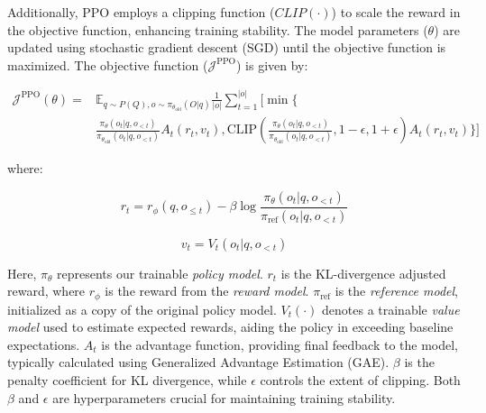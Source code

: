 Additionally, PPO employs a clipping function ($CLIP(\cdot)$) to scale the reward in the objective function, enhancing training stability. The model parameters ($\theta$) are updated using stochastic gradient descent (SGD) until the objective function is maximized. The objective function ($\mathcal{J}^{\text{PPO}}$) is given by:




\begin{footnotesize}
    \begin{equation}
        \begin{split}
            \mathcal{J}^{\text{PPO}}(\theta) =
             &\mathbb{E}_{q\sim P(Q), o\sim\pi_{\theta_{\text{old}}}(O|q)}\frac{1}{|o|}\sum_{t=1}^{|o|}\Bigg[\min\Bigg\{ \\
             &\frac{\pi_{\theta}(o_t | q, o_{<t})}{\pi_{\theta_{\text{old}}}(o_t | q, o_{<t})} A_t(r_t, v_t), \text{CLIP}\left(\frac{\pi_{\theta}(o_t | q, o_{<t})}{\pi_{\theta_{\text{old}}}(o_t | q, o_{<t})}, 1 - \epsilon, 1+\epsilon\right)A_t(r_t, v_t)\Bigg\}\Bigg]
        \end{split}
    \end{equation}
\end{footnotesize}



where:

\begin{equation*}
r_t = r_\phi(q, o_{\leq t}) - \beta \log\frac{\pi_{\theta}(o_t | q, o_{<t})}{\pi_{\text{ref}}(o_t | q, o_{<t})}
\end{equation*}

\begin{equation*}
v_t = V_t(o_t | q, o_{<t})
\end{equation*}

Here, $\pi_{\theta}$ represents our trainable \textit{policy model}. $r_t$ is the KL-divergence adjusted reward, where $r_\phi$ is the reward from the \textit{reward model}. $\pi_{\text{ref}}$ is the \textit{reference model}, initialized as a copy of the original policy model. $V_t(\cdot)$ denotes a trainable \textit{value model} used to estimate expected rewards, aiding the policy in exceeding baseline expectations. $A_t$ is the advantage function, providing final feedback to the model, typically calculated using Generalized Advantage Estimation (GAE). $\beta$ is the penalty coefficient for KL divergence, while $\epsilon$ controls the extent of clipping. Both $\beta$ and $\epsilon$ are hyperparameters crucial for maintaining training stability.

